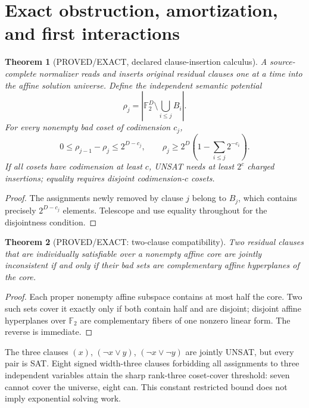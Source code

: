 \documentclass[11pt]{article}
\newtheorem{theorem}{Theorem}
\begin{document}
\section{Exact obstruction, amortization, and first interactions}
\begin{theorem}[PROVED/EXACT, declared clause-insertion calculus]
A source-complete normalizer reads and inserts original residual clauses one at a time into the affine solution universe. Define the independent semantic potential
\[
\rho_j=\left|\mathbb F_2^D\setminus\bigcup_{i\le j}B_i\right|.
\]
For every nonempty bad coset of codimension $c_j$,
\[
0\le\rho_{j-1}-\rho_j\le2^{D-c_j},\qquad
\rho_j\ge2^D\left(1-\sum_{i\le j}2^{-c_i}\right).
\]
If all cosets have codimension at least $c$, UNSAT needs at least $2^c$ charged insertions; equality requires disjoint codimension-$c$ cosets.
\end{theorem}
\begin{proof}
The assignments newly removed by clause $j$ belong to $B_j$, which contains precisely $2^{D-c_j}$ elements. Telescope and use equality throughout for the disjointness condition.
\end{proof}
\begin{theorem}[PROVED/EXACT: two-clause compatibility]
Two residual clauses that are individually satisfiable over a nonempty affine core are jointly inconsistent if and only if their bad sets are complementary affine hyperplanes of the core.
\end{theorem}
\begin{proof}
Each proper nonempty affine subspace contains at most half the core. Two such sets cover it exactly only if both contain half and are disjoint; disjoint affine hyperplanes over $\mathbb F_2$ are complementary fibers of one nonzero linear form. The reverse is immediate.
\end{proof}
The three clauses $(x)$, $(\neg x\vee y)$, $(\neg x\vee\neg y)$ are jointly UNSAT, but every pair is SAT. Eight signed width-three clauses forbidding all assignments to three independent variables attain the sharp rank-three coset-cover threshold: seven cannot cover the universe, eight can. This constant restricted bound does not imply exponential solving work.
\end{document}
